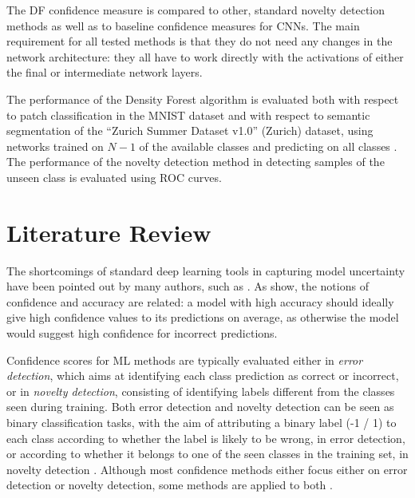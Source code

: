 \documentclass[10pt]{article}
\begin{document}
The \gls{DF} confidence measure is compared to other, standard novelty detection methods as well as to baseline confidence measures for \glspl{CNN}. The main requirement for all tested methods is that they do not need any changes in the network architecture: they all have to work directly with the activations of either the final or intermediate network layers.

The performance of the Density Forest algorithm is evaluated both with respect to patch classification in the MNIST dataset and with respect to semantic segmentation of the ``Zurich Summer Dataset v1.0'' (Zurich) dataset, using networks trained on $N-1$ of the available classes and predicting on all classes \cite{mnist, Volpi2015SemanticSO}. The performance of the novelty detection method in detecting samples of the unseen class is evaluated using \gls{ROC} curves.

\section{Literature Review}
\label{sec:lit}
The shortcomings of standard deep learning tools in capturing model uncertainty have been pointed out by many authors, such as \textcite{ghahramani, NguyenYC14, mandelbaum17}. As \textcite{subramanya} show, the notions of confidence and accuracy are related: a model with high accuracy should ideally give high confidence values to its predictions on average, as otherwise the model would suggest high confidence for incorrect predictions.

Confidence scores for \gls{ML} methods are typically evaluated either in \textit{error detection}, which aims at identifying each class prediction as correct or incorrect, or in \textit{novelty detection}, consisting of identifying labels different from the classes seen during training. Both error detection and novelty detection can be seen as binary classification tasks, with the aim of attributing a binary label (-1 / 1) to each class according to whether the label is likely to be wrong, in error detection, or according to whether it belongs to one of the seen classes in the training set, in novelty detection \cite{Bahat_2018, mandelbaum17}. Although most confidence methods either focus either on error detection or novelty detection, some methods are applied to both \cite{Sun2018KSconfA, Bahat_2018, mandelbaum17}.
\end{document}
